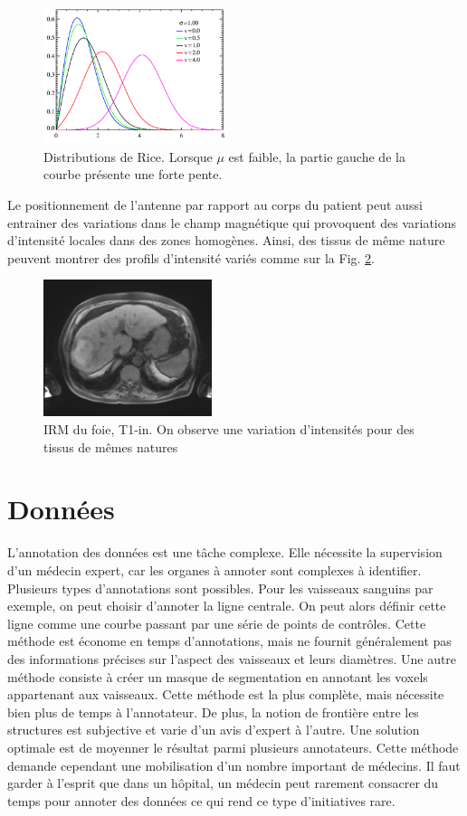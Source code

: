 \begin{figure}
    \centering
    \includegraphics[height=4cm]{Images/rice_PDF.png}
    \caption{Distributions de Rice. Lorsque $\mu$ est faible, la partie gauche de la courbe présente une forte pente.}
    \label{fig:MRI_Rice}
\end{figure}

Le positionnement de l'antenne par rapport au corps du patient peut aussi entrainer des variations dans le champ magnétique qui provoquent des variations d'intensité locales dans des zones homogènes. Ainsi, des tissus de même nature peuvent montrer des profils d'intensité variés comme sur la Fig. \ref{fig:MRI_variations}.

\begin{figure}
    \centering
    \includegraphics[height=4cm]{Images/MRI_field_variations.png}
    \caption{IRM du foie, T1-in. On observe une variation d'intensités pour des tissus de mêmes natures}
    \label{fig:MRI_variations}
\end{figure}

\section{Données}

L'annotation des données est une tâche complexe. Elle nécessite la supervision d'un médecin expert, car les organes à annoter sont complexes à identifier. Plusieurs types d'annotations sont possibles. Pour les vaisseaux sanguins par exemple, on peut choisir d'annoter la ligne centrale. On peut alors définir cette ligne comme une courbe passant par une série de points de contrôles. Cette méthode est économe en temps d'annotations, mais ne fournit généralement pas des informations précises sur l'aspect des vaisseaux et leurs diamètres. 
Une autre méthode consiste à créer un masque de segmentation en annotant les voxels appartenant aux vaisseaux. Cette méthode est la plus complète, mais nécessite bien plus de temps à l'annotateur. De plus, la notion de frontière entre les structures est subjective et varie d'un avis d'expert à l'autre. Une solution optimale est de moyenner le résultat parmi plusieurs annotateurs. Cette méthode demande cependant une mobilisation d'un nombre important de médecins. Il faut garder à l'esprit que dans un hôpital, un médecin peut rarement consacrer du temps pour annoter des données ce qui rend ce type d'initiatives rare.

